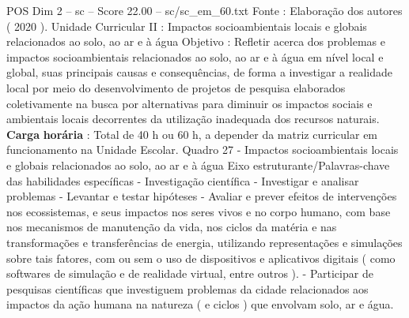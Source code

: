 \begin{textsample}{POS Dim 2 – sc – Score 22.00 – sc/sc\_em\_60.txt}
Fonte : Elaboração dos autores ( 2020 ).
Unidade Curricular II : Impactos socioambientais locais e globais relacionados ao solo, ao ar e à água Objetivo : Refletir acerca dos problemas e impactos socioambientais relacionados ao solo, ao ar e à água em nível local e global, suas principais causas e consequências, de forma a investigar a realidade local por meio do desenvolvimento de projetos de pesquisa elaborados coletivamente na busca por alternativas para diminuir os impactos sociais e ambientais locais decorrentes da utilização inadequada dos recursos naturais. \textbf{Carga} \textbf{horária} : Total de 40 h ou 60 h, a depender da matriz curricular em funcionamento na Unidade Escolar.
Quadro 27 - Impactos socioambientais locais e globais relacionados ao solo, ao ar e à água Eixo estruturante/Palavras-chave das habilidades específicas - Investigação científica - Investigar e analisar problemas - Levantar e testar hipóteses - Avaliar e prever efeitos de intervenções nos ecossistemas, e seus impactos nos seres vivos e no corpo humano, com base nos mecanismos de manutenção da vida, nos ciclos da matéria e nas transformações e transferências de energia, utilizando representações e simulações sobre tais fatores, com ou sem o uso de dispositivos e aplicativos digitais ( como softwares de simulação e de realidade virtual, entre outros ). - Participar de pesquisas científicas que investiguem problemas da cidade relacionados aos impactos da ação humana na natureza ( e ciclos ) que envolvam solo, ar e água.

\end{textsample}
